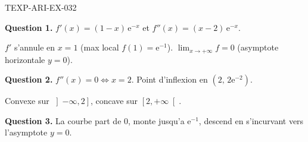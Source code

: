 \begin{corrige}{TEXP-ARI-EX-032}

\textbf{Question 1.} $f'(x) = (1-x)\,\mathrm{e}^{-x}$ et $f''(x) = (x-2)\,\mathrm{e}^{-x}$.


$f'$ s'annule en $x=1$ (max local $f(1)=\mathrm{e}^{-1}$). $\lim_{x\to+\infty} f = 0$ (asymptote horizontale $y=0$).

\textbf{Question 2.} $f''(x) = 0 \iff x = 2$. Point d'inflexion en $(2,\, 2\mathrm{e}^{-2})$.

Convexe sur $\left]-\infty, 2\right]$, concave sur $\left[2, +\infty\right[$.

\textbf{Question 3.} La courbe part de $0$, monte jusqu'a $\mathrm{e}^{-1}$, descend en s'incurvant vers l'asymptote $y=0$.

\end{corrige}
